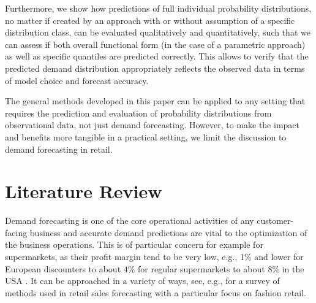 \documentclass[BCOR=1mm, DIV=calc,10pt,
twoside=true,
twocolumn,
headings=normal]{scrartcl}
\begin{document}
Furthermore, we show how predictions of full individual probability distributions, no matter if created by an approach with or without assumption of a specific distribution class, can be evaluated qualitatively and quantitatively, such that we can assess if both overall functional form (in the case of a parametric approach) as well as specific quantiles are predicted correctly. This allows to verify that the predicted demand distribution appropriately reflects the observed data in terms of model choice and forecast accuracy.

The general methods developed in this paper can be applied to any setting that requires the prediction and evaluation of probability distributions from observational data, not just demand forecasting. However, to make the impact and benefits more tangible in a practical setting, we limit the discussion to demand forecasting in retail.


\section{Literature Review}
\label{sec:LitRev}

Demand forecasting is one of the core operational activities of any customer-facing business and accurate demand predictions are vital to the optimization of the business operations. This is of particular concern for example for supermarkets, as their profit margin tend to be very low, e.g., 1\% and lower for European discounters \cite{MarginLidlSweden} to about 4\% for regular supermarkets \cite{MarginWillysSweden,MarginHemkopSweden} to about 8\% in the USA \cite{MarginPublixUSA}. It can be approached in a variety of ways, see, e.g., \cite{beheshti2015survey} for a survey of methods used in retail sales forecasting with a particular focus on fashion retail.
\end{document}
